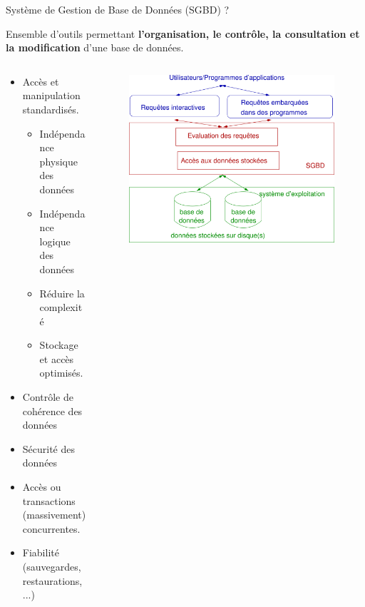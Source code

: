 \documentclass[xetex,dvipsnames]{beamer}
\begin{document}
\begin{frame}[t]{Système de Gestion de Base de Données (SGBD) ?}
	     \begin{exampleblock}{}
	     	Ensemble d'outils permettant \textbf{l'organisation, le contrôle, la consultation et la modification} d'une base de données.
	     \end{exampleblock}
  \begin{columns}
	    \begin{column}{0.6\textwidth}
\begin{footnotesize}
	  	\begin{itemize}
	  		\item Accès et manipulation standardisés.
		 	\begin{itemize}
		 	\item Indépendance physique des données
	  		\item Indépendance logique des données
	  		\item Réduire la complexité
	 		\item Stockage et accès optimisés.
		 	\end{itemize}
		 	\item Contrôle de cohérence des données
		 	\item Sécurité des données
		 	\item Accès ou transactions (massivement) concurrentes.
		 	\item Fiabilité (sauvegardes, restaurations, ...)
		 	\end{itemize}
\end{footnotesize}
		\end{column}
		\begin{column}{0.4\textwidth}
		\begin{figure} \begin{center}\includegraphics[width=0.99\textwidth]{./figures/SGBDR.png}\end{center}\end{figure}
		\end{column}
	\end{columns}
\end{frame}
\end{document}
